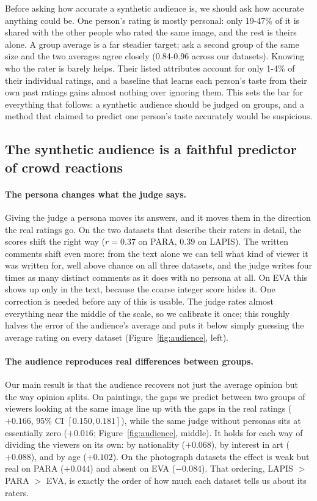 \documentclass{article}
\begin{document}
Before asking how accurate a synthetic audience is, we should ask how accurate anything could be. One person's rating is mostly personal: only 19-47\% of it is shared with the other people who rated the same image, and the rest is theirs alone. A group average is a far steadier target; ask a second group of the same size and the two averages agree closely (0.84-0.96 across our datasets). Knowing who the rater is barely helps. Their listed attributes account for only 1-4\% of their individual ratings, and a baseline that learns each person's taste from their own past ratings gains almost nothing over ignoring them. This sets the bar for everything that follows: a synthetic audience should be judged on groups, and a method that claimed to predict one person's taste accurately would be suspicious.

\subsection{The synthetic audience is a faithful predictor of crowd reactions}
\label{sec:audience}

\paragraph{The persona changes what the judge says.} Giving the judge a persona moves its answers, and it moves them in the direction the real ratings go. On the two datasets that describe their raters in detail, the scores shift the right way ($r{=}0.37$ on PARA, $0.39$ on LAPIS). The written comments shift even more: from the text alone we can tell what kind of viewer it was written for, well above chance on all three datasets, and the judge writes four times as many distinct comments as it does with no persona at all. On EVA this shows up only in the text, because the coarse integer score hides it. One correction is needed before any of this is usable. The judge rates almost everything near the middle of the scale, so we calibrate it once; this roughly halves the error of the audience's average and puts it below simply guessing the average rating on every dataset (Figure~\ref{fig:audience}, left).

\paragraph{The audience reproduces real differences between groups.} Our main result is that the audience recovers not just the average opinion but the way opinion splits. On paintings, the gaps we predict between two groups of viewers looking at the same image line up with the gaps in the real ratings ($+0.166$, 95\% CI $[0.150, 0.181]$), while the same judge without personas sits at essentially zero ($+0.016$; Figure~\ref{fig:audience}, middle). It holds for each way of dividing the viewers on its own: by nationality ($+0.068$), by interest in art ($+0.088$), and by age ($+0.102$). On the photograph datasets the effect is weak but real on PARA ($+0.044$) and absent on EVA ($-0.084$). That ordering, LAPIS $>$ PARA $>$ EVA, is exactly the order of how much each dataset tells us about its raters.
\end{document}
